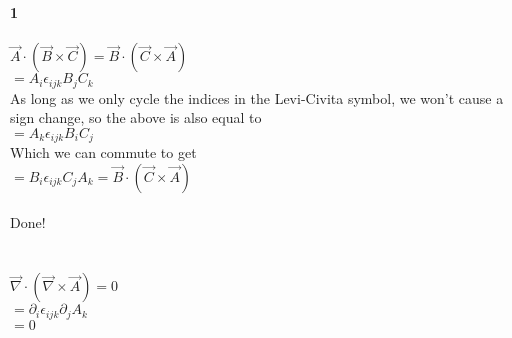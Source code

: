 \documentclass[prb,preprint]
{revtex4-1}
\newcommand{\PRLsep}{\noindent\makebox[\linewidth]{\resizebox{0.8888\linewidth}{2pt}{$\bullet$}}\bigskip}
\begin{document}
{\bf 1}\\
\\
$\vec{A} \cdot \left(\vec{B} \times \vec{C}\right) = \vec{B} \cdot \left(\vec{C} \times \vec{A}\right)$
\\
$= A_i \epsilon_{ijk} B_j C_k$
\\
As long as we only cycle the indices in the Levi-Civita symbol, we won't cause a sign change, so the above is also equal to 
\\
$= A_k \epsilon_{ijk} B_i C_j$
\\
Which we can commute to get 
\\
$= B_i \epsilon_{ijk} C_j A_k = \vec{B} \cdot \left(\vec{C} \times \vec{A}\right)$
\\\\
Done!
\\
\PRLsep
\\\\
$\vec{\nabla} \cdot \left(\vec{\nabla} \times \vec{A} \right) = 0$
\\
$=\partial_i \epsilon_{ijk} \partial_j A_k$\\
$= 0$
\end{document}

